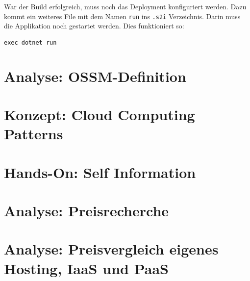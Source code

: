 \documentclass[12pt,a4paper]{article}
\begin{document}
War der Build erfolgreich, muss noch das Deployment konfiguriert werden. Dazu kommt ein weiteres File mit dem Namen \texttt{run} ins \texttt{.s2i} Verzeichnis. Darin muss die Applikation noch gestartet werden. Dies funktioniert so:
\begin{lstlisting}
exec dotnet run
\end{lstlisting}
\section{Analyse: OSSM-Definition}

\section{Konzept: Cloud Computing Patterns}

\section{Hands-On: Self Information}

\section{Analyse: Preisrecherche}

\section{Analyse: Preisvergleich eigenes Hosting, IaaS und PaaS}
\end{document}
